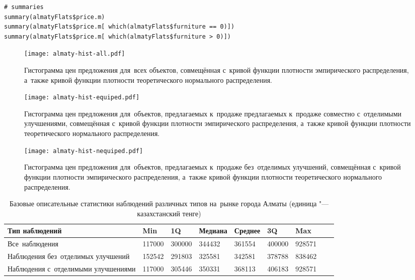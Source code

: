 \documentclass[]{scrreprt}
\begin{document}
%
\begin{lstlisting}[float, caption = Построение базовых описательных статистик для~наблюдений различных типов, firstnumber=1, label= lst:summaries-R]
# summaries
summary(almatyFlats$price.m)
summary(almatyFlats$price.m[ which(almatyFlats$furniture == 0)])
summary(almatyFlats$price.m[ which(almatyFlats$furniture > 0)])
\end{lstlisting}
%
\begin{figure}[ht]
	\centering
	\texttt{[image: almaty-hist-all.pdf]}
	\caption{Гистограмма цен предложения для~всех объектов, совмещённая с~кривой функции плотности эмпирического распределения, а~также кривой функции плотности теоретического нормального распределения.}
	\label{fig:almaty-hist-all-r}
\end{figure}
%
%
\begin{figure}[ht]
	\centering
	\texttt{[image: almaty-hist-equiped.pdf]}
	\caption{Гистограмма цен предложения для~объектов, предлагаемых к~продаже предлагаемых к~продаже совместно с~отделимыми улучшениями, совмещённая с~кривой функции плотности эмпирического распределения, а~также кривой функции плотности теоретического нормального распределения.}
	\label{fig:almaty-hist-equiped-r}
\end{figure}
%
%
\begin{figure}[ht]
	\centering
	\texttt{[image: almaty-hist-nequiped.pdf]}
	\caption{Гистограмма цен предложения для~объектов, предлагаемых к~продаже без~отделимых улучшений, совмещённая с~кривой функции плотности эмпирического распределения, а~также кривой функции плотности теоретического нормального распределения.}
	\label{fig:almaty-hist-nequiped-r}
\end{figure}
%
\begin{table}[ht]
	\caption{Базовые описательные статистики наблюдений различных типов на~рынке города Алматы (единица "--- казахстанский тенге)}\label{tab:summaries-almaty-R}
	\centering
	\begin{tabular}{lllllllll}
		\hline
		Тип наблюдений&Min&1Q&Медиана&Среднее&3Q&Max\\
		\hline
		Все~наблюдения&117000&300000&344432&361554&400000&928571\\
		\hline
		Наблюдения без~отделимых улучшений&152542&291803&325581&342581&378788&838462\\
		\hline
		Наблюдения с~отделимыми улучшениями&117000&305446&350331&368113&406183&928571\\
		\hline
	\end{tabular}
\end{table}
\end{document}
